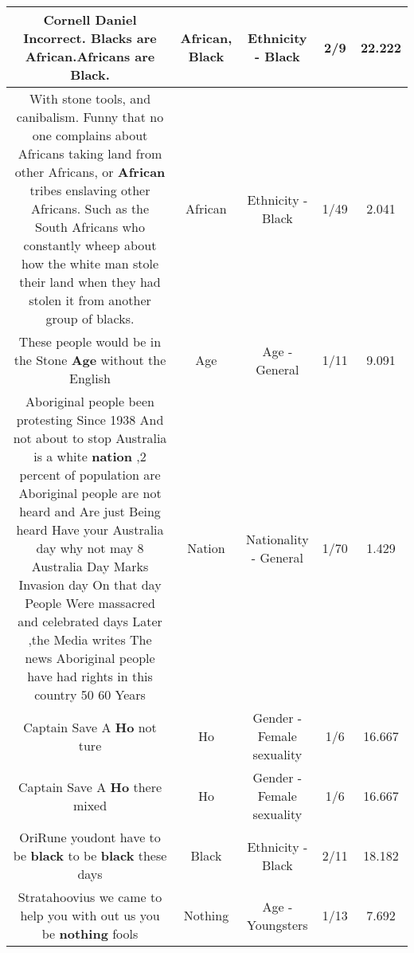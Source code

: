 \documentclass[11pt]{article}
\newlength\mylength
\begin{document}
\begin{center}
\begin{longtable}{|C{.65\mylength}|C{.30\mylength}|C{.12\mylength}|C{.12\mylength}|C{.12\mylength}|}
  \small Cornell Daniel Incorrect. Blacks are \textbf{African}.Africans are \textbf{Black}.\normalsize   & African, Black & Ethnicity - Black & 2/9 & 22.222 \\  \hline
  \small With stone tools, and canibalism. Funny that no one complains about Africans taking land from other Africans, or \textbf{African} tribes enslaving other Africans. Such as the South Africans who constantly wheep about how the white man stole their land when they had stolen it from another group of blacks.\normalsize   & African & Ethnicity - Black & 1/49 & 2.041 \\  \hline
  \small These people would be in the Stone \textbf{Age} without the English\normalsize   & Age & Age - General & 1/11 & 9.091 \\  \hline
  \small Aboriginal people been protesting Since 1938 And not about to stop Australia is a white \textbf{nation} ,2 percent of population  are Aboriginal people are not heard and Are just Being heard Have your Australia day why not may 8  Australia Day Marks Invasion day On that day People Were massacred and celebrated days Later ,the Media writes The news Aboriginal people have had rights in this country 50 60 Years\normalsize   & Nation & Nationality - General & 1/70 & 1.429 \\  \hline
  \small Captain Save A \textbf{Ho}  not ture\normalsize   & Ho & Gender - Female sexuality & 1/6 & 16.667 \\  \hline
  \small Captain Save A \textbf{Ho} there mixed\normalsize   & Ho & Gender - Female sexuality & 1/6 & 16.667 \\  \hline
  \small OriRune youdont have to be \textbf{black} to be \textbf{black} these days\normalsize   & Black & Ethnicity - Black & 2/11 & 18.182 \\  \hline
  \small Stratahoovius we came to help you with out us you be \textbf{nothing} fools\normalsize   & Nothing & Age - Youngsters & 1/13 & 7.692 \\  \hline

\end{longtable}
\end{center}
\end{document}

